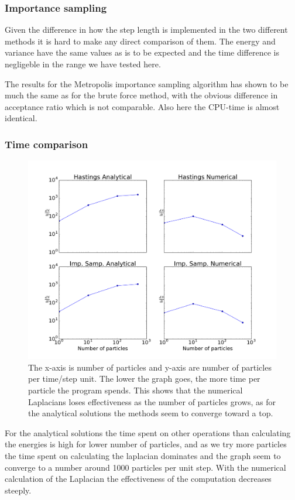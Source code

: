 \documentclass[12pt]{article}
\begin{document}
  \subsubsection{Importance sampling}
  
  Given the difference in how the step length is implemented in the two different methods it is
  hard to make any direct comparison of them. The energy and variance have the same values as is
  to be expected and the time difference is negligeble in the range we have tested here.
  \newpage
  
  The results for the Metropolis importance sampling algorithm has shown to be much the same as for
  the brute force method, with the obvious difference in acceptance ratio which is not comparable.
  Also here the CPU-time is almost identical.

  \newpage

  \subsubsection{Time comparison}
  \begin{figure}[h!]
    \centerline{
    \includegraphics[scale=0.49]{graphs/Npart_time.pdf}
  }
    \caption{The x-axis is number of particles and y-axis are number of particles per time/step %
	     unit. The lower the graph goes, the more time per particle the program spends. %
	     This shows that the numerical Laplacians loses effectiveness as the number of %
	     particles grows, as for the analytical solutions the methods seem to converge %
	     toward a top.%
	     }
    
  \end{figure}
  For the analytical solutions the time spent on other operations than calculating the energies
  is high for lower number of particles, and as we try more particles the time spent on calculating
  the laplacian dominates and the graph seem to converge to a number around 1000 particles per unit
  step. With the numerical calculation of the Laplacian the effectiveness of the computation
  decreases steeply.



  \appendix
  
  
  
\end{document}
